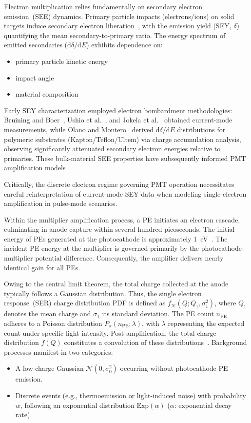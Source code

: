 Electron multiplication relies fundamentally on secondary electron emission~(SEE) dynamics. Primary particle impacts (electrons/ions) on solid targets induce secondary electron liberation~\cite{2016Secondary}, with the emission yield (SEY, $\delta$) quantifying the mean secondary-to-primary ratio. The energy spectrum of emitted secondaries ($\mathrm{d}\delta/\mathrm{d}E$) exhibits dependence on:
\begin{itemize}
	\item primary particle kinetic energy
	\item impact angle
	\item material composition~\cite{2002Probabilistic}
\end{itemize}

Early SEY characterization employed electron bombardment methodologies: Bruining and Boer~\cite{1938Secondary}, Ushio et al.~\cite{1988Secondary}, and Jokela et al.~\cite{2012Secondary} obtained current-mode measurements, while Olano and Montero~\cite{OLANO2020103456} derived $\mathrm{d}\delta/\mathrm{d}E$ distributions for polymeric substrates (Kapton/Teflon/Ultem) via charge accumulation analysis, observing significantly attenuated secondary electron energies relative to primaries. These bulk-material SEE properties have subsequently informed PMT amplification models~\cite{2012An,2021Effects}.

Critically, the discrete electron regime governing PMT operation necessitates careful reinterpretation of current-mode SEY data when modeling single-electron amplification in pulse-mode scenarios.

Within the multiplier amplification process, a PE initiates an electron cascade, culminating in anode capture within several hundred picoseconds. The initial energy of PEs generated at the photocathode is approximately \SI{1}{eV}~\cite{Nathan1970TheED}. The incident PE energy at the multiplier is governed primarily by the photocathode-multiplier potential difference. Consequently, the amplifier delivers nearly identical gain for all PEs.

Owing to the central limit theorem, the total charge collected at the anode typically follows a Gaussian distribution. Thus, the single electron response~(SER) charge distribution PDF is defined as $ f_{\mathcal{N}}(Q; Q_1,\sigma_1^2) $, where $ Q_1 $ denotes the mean charge and $ \sigma_1 $ its standard deviation. The PE count $ n_{\mathrm{PE}} $ adheres to a Poisson distribution $ P_\pi(n_{\mathrm{PE}};\lambda) $, with $ \lambda $ representing the expected count under specific light intensity. Post-amplification, the total charge distribution $ f(Q) $ constitutes a convolution of these distributions~\cite{1994Absolute}. Background processes manifest in two categories:
\begin{itemize}
	\item A low-charge Gaussian $ \mathcal{N}(0,\sigma_0^2) $ occurring without photocathode PE emission.
	\item Discrete events (e.g., thermoemission or light-induced noise) with probability $ w $, following an exponential distribution $ \mathrm{Exp}(\alpha) $ ($\alpha$: exponential decay rate).
\end{itemize}

